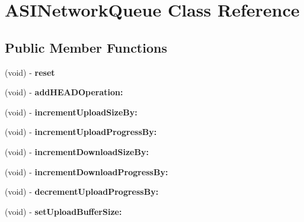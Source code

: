 \hypertarget{interface_a_s_i_network_queue}{
\section{ASINetworkQueue Class Reference}
\label{interface_a_s_i_network_queue}
}
\subsection*{Public Member Functions}
\begin{DoxyCompactItemize}
\item 
\hypertarget{interface_a_s_i_network_queue_a623cc4e592822a23d4751bbcab630558}{
(void) -\/ {\bfseries reset}}
\label{interface_a_s_i_network_queue_a623cc4e592822a23d4751bbcab630558}

\item 
\hypertarget{interface_a_s_i_network_queue_a0c5d19648386364651e055b273597a75}{
(void) -\/ {\bfseries addHEADOperation:}}
\label{interface_a_s_i_network_queue_a0c5d19648386364651e055b273597a75}

\item 
\hypertarget{interface_a_s_i_network_queue_aa741f5a7ea9162b1009e06c20bbd059d}{
(void) -\/ {\bfseries incrementUploadSizeBy:}}
\label{interface_a_s_i_network_queue_aa741f5a7ea9162b1009e06c20bbd059d}

\item 
\hypertarget{interface_a_s_i_network_queue_a80cb21f7247d59e86ec03eb53c46b32f}{
(void) -\/ {\bfseries incrementUploadProgressBy:}}
\label{interface_a_s_i_network_queue_a80cb21f7247d59e86ec03eb53c46b32f}

\item 
\hypertarget{interface_a_s_i_network_queue_a03035b0202047221aa6c5497cbd0f77f}{
(void) -\/ {\bfseries incrementDownloadSizeBy:}}
\label{interface_a_s_i_network_queue_a03035b0202047221aa6c5497cbd0f77f}

\item 
\hypertarget{interface_a_s_i_network_queue_a7f6af576fd494c89383b1448bbe8e7a5}{
(void) -\/ {\bfseries incrementDownloadProgressBy:}}
\label{interface_a_s_i_network_queue_a7f6af576fd494c89383b1448bbe8e7a5}

\item 
\hypertarget{interface_a_s_i_network_queue_a6c29fa8b8e1bb23bb247387281569a02}{
(void) -\/ {\bfseries decrementUploadProgressBy:}}
\label{interface_a_s_i_network_queue_a6c29fa8b8e1bb23bb247387281569a02}

\item 
\hypertarget{interface_a_s_i_network_queue_a1aa7f67c2b2371f12f43fe1c48f055e8}{
(void) -\/ {\bfseries setUploadBufferSize:}}
\label{interface_a_s_i_network_queue_a1aa7f67c2b2371f12f43fe1c48f055e8}


\end{DoxyCompactItemize}
